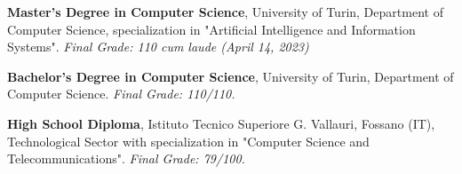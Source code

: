 
\begin{scholarship}
	{\textbf{Master's Degree in Computer Science}, University of Turin, Department of Computer Science, specialization in "Artificial Intelligence and Information Systems". \textit{Final Grade: 110 cum laude (April 14, 2023)}}
					
	{\textbf{Bachelor's Degree in Computer Science}, University of Turin, Department of Computer Science. \textit{Final Grade: 110/110.}}
						
	{\textbf{High School Diploma}, Istituto Tecnico Superiore G. Vallauri, Fossano (IT), Technological Sector with specialization in "Computer Science and Telecommunications". \textit{Final Grade: 79/100.}}
		
\end{scholarship}
